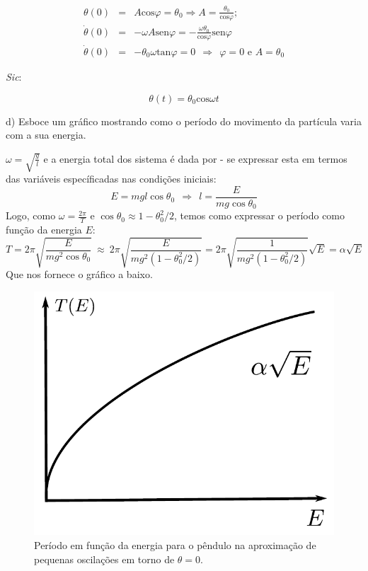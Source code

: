 \begin{enumerate}[start=1,label={\bfseries Q\arabic*.}]
%
$$
\begin{array}{ccl}
\theta(0) & = & A \mathrm{cos} \varphi  =  \theta_{0} \Rightarrow A = \frac{\theta_{0}}{\mathrm{cos} \varphi}; \\
\dot{\theta}(0) & = & - \omega A \mathrm{sen} \varphi = - \frac{\omega \theta_{0}}{\mathrm{cos}\varphi } \mathrm{sen} \varphi \\
\dot{\theta}(0) & = & - \theta_{0} \omega \mathrm{tan} \varphi = 0 \  \  \Rightarrow \  \  \varphi = 0 \mbox{ e } A = \theta_{0}
\end{array}
$$

\textit{Sic}:

$$
\theta(t) = \theta_{0} \mathrm{cos}\omega t
$$


d) Esboce um gráfico mostrando como o período do movimento da partícula varia com a sua energia.


\resposta  $\omega = \sqrt{\frac{g}{l}}$ e a energia total dos sistema é dada por - se expressar esta em termos das variáveis específicadas nas condições iniciais:
$$
E = mgl \cos \theta_{0}  \ \ \Rightarrow \ \ l = \frac{E}{mg \cos \theta_{0}}
$$
Logo, como $\omega = \frac{2 \pi}{T}$ e $\cos \theta_{0} \approx 1 - \theta_{0}^{2} / 2$, temos como expressar o período como função da energia $E$:
$$
T = 2\pi \sqrt{ \frac{E}{mg^{2} \cos \theta_{0} } }  \ \approx \  2 \pi \sqrt{\frac{E}{m g^{2} (1 - \theta_{0}^{2} / 2 ) } } = 2 \pi \sqrt{\frac{1}{m g^{2} (1 - \theta_{0}^{2} / 2 ) } } \sqrt{E} = \alpha \sqrt{E}
$$
Que nos fornece o gráfico a baixo.
\begin{figure}[H]
\centering
\includegraphics[scale=0.7]{classica-img/energia.pdf}
\caption{Período em função da energia para o pêndulo na aproximação de pequenas oscilações em torno de $\theta = 0$.}
\end{figure}




\end{enumerate}
